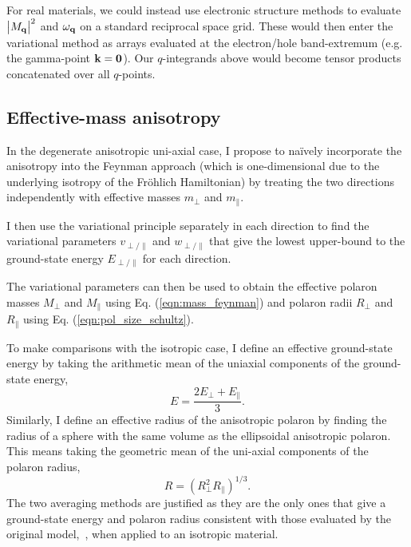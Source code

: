For real materials, we could instead use electronic structure methods to evaluate $\abs{M_{\vb{q}}}^2$ and $\omega_{\vb{q}}$ on a standard reciprocal space grid. These would then enter the variational method as arrays evaluated at the electron/hole band-extremum (e.g. the gamma-point $\vb{k} = \vb{0}$). Our $q$-integrands above would become tensor products concatenated over all $q$-points.

\subsection{Effective-mass anisotropy}
\label{subsec:3-2-1}

In the degenerate anisotropic uni-axial case, I propose to na\"ively incorporate the anisotropy into the Feynman approach (which is one-dimensional due to the underlying isotropy of the Fr\"ohlich Hamiltonian) by treating the two directions independently with effective masses $m_\perp$ and $m_\parallel$.

I then use the variational principle separately in each direction to find the variational parameters $v_{\perp/\parallel}$ and $w_{\perp/\parallel}$ that give the lowest upper-bound to the ground-state energy $E_{\perp/\parallel}$ for each direction. 

The variational parameters can then be used to obtain the effective polaron masses $M_{\perp}$ and $M_{\parallel}$ using Eq. (\ref{eqn:mass_feynman}) and polaron radii $R_{\perp}$ and $R_{\parallel}$ using Eq. (\ref{eqn:pol_size_schultz}). 

To make comparisons with the isotropic case, I define an effective ground-state energy by taking the arithmetic mean of the uniaxial components of the ground-state energy,
\begin{equation}
    E = \frac{2 E_\perp + E_\parallel}{3}.
\end{equation}
Similarly, I define an effective radius of the anisotropic polaron by finding the radius of a sphere with the same volume as the ellipsoidal anisotropic polaron. This means taking the geometric mean of the uni-axial components of the polaron radius, 
\begin{equation}
    R = \left(R^2_{\perp} R_{\parallel}\right)^{1/3}.
\end{equation}
The two averaging methods are justified as they are the only ones that give a ground-state energy and polaron radius consistent with those evaluated by the original model,~\cite{feynman_slow_1955}, when applied to an isotropic material.

